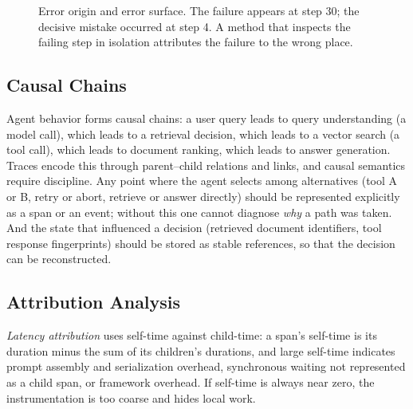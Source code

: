 \documentclass[11pt]{book}
\begin{document}
\begin{figure}[htbp]
\centering
{}
\caption{Error origin and error surface. The failure appears at step 30; the decisive mistake occurred at step 4. A method that inspects the failing step in isolation attributes the failure to the wrong place.}
\label{fig:error-origin}
\end{figure}

\subsection{Causal Chains}

Agent behavior forms causal chains: a user query leads to query understanding (a model call), which leads to a retrieval decision, which leads to a vector search (a tool call), which leads to document ranking, which leads to answer generation. Traces encode this through parent--child relations and links, and causal semantics require discipline. Any point where the agent selects among alternatives (tool A or B, retry or abort, retrieve or answer directly) should be represented explicitly as a span or an event; without this one cannot diagnose \textit{why} a path was taken. And the state that influenced a decision (retrieved document identifiers, tool response fingerprints) should be stored as stable references, so that the decision can be reconstructed.

\subsection{Attribution Analysis}

\textit{Latency attribution} uses self-time against child-time: a span's self-time is its duration minus the sum of its children's durations, and large self-time indicates prompt assembly and serialization overhead, synchronous waiting not represented as a child span, or framework overhead. If self-time is always near zero, the instrumentation is too coarse and hides local work.
\end{document}
